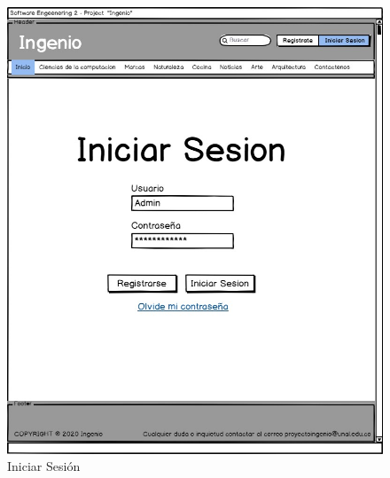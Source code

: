 \documentclass[a4paper,12 pt]{article}
\begin{document}
\begin{figure}[H]
    \centering
    \includegraphics[scale = 1]{images/IniciarSesion.jpg}
    \caption{Iniciar Sesión}
    \label{F101}
\end{figure}{}
\end{document}

